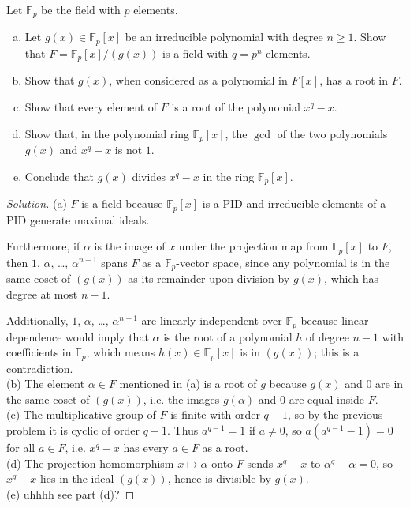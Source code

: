 \documentclass[10pt]{article}
\providecommand{\FF}{\mathbb F}
\providecommand{\ii}{\item}
\newenvironment{soln}{\begin{proof}[Solution]}{\end{proof}}
\begin{document}
\begin{problem}
    Let $\FF_p$ be the field with $p$ elements.
    \begin{enumerate}[(a)]
	\ii Let $g(x)\in\FF_p[x]$ be an irreducible polynomial with degree $n\ge1$.
	Show that $F=\FF_p[x]/(g(x))$ is a field with $q=p^n$ elements.
	\ii Show that $g(x)$, when considered as
	a polynomial in $F[x]$, has a root in $F$.
	\ii Show that every element of $F$ is a root of the polynomial $x^q - x$.
	\ii Show that, in the polynomial ring $\FF_p[x]$,
	the $\gcd$ of the two polynomials $g(x)$ and $x^q - x$ is not $1$.
	\ii Conclude that $g(x)$ divides $x^q - x$ in the ring $\FF_p[x]$.
    \end{enumerate}
\end{problem}

\begin{soln}
    (a) $F$ is a field because $\FF_p[x]$ is a PID
    and irreducible elements of a PID generate maximal ideals.

    Furthermore, if $\alpha$ is the image of $x$
    under the projection map from $\FF_p[x]$ to $F$,
    then $1$, $\alpha$, \dots, $\alpha^{n-1}$ spans
    $F$ as a $\FF_p$-vector space, since any polynomial is in the same
    coset of $(g(x))$ as its remainder upon division by $g(x)$,
    which has degree at most $n-1$.

    Additionally, $1$, $\alpha$, \dots, $\alpha^{n-1}$ are
    linearly independent over $\FF_p$
    because linear dependence would imply that
    $\alpha$ is the root of a polynomial $h$ of degree $n-1$
    with coefficients in $\FF_p$, which means $h(x)\in\FF_p[x]$
    is in $(g(x))$; this is a contradiction.
    \\

    (b) The element $\alpha\in F$ mentioned in (a) is a root of $g$
    because $g(x)$ and $0$ are in the same coset of $(g(x))$, i.e.
    the images $g(\alpha)$ and $0$ are equal inside $F$.
    \\

    (c) The multiplicative group of $F$ is finite with order $q-1$,
    so by the previous problem it is cyclic of order $q-1$.
    Thus $a^{q-1} = 1$ if $a\ne 0$, so
    $a(a^{q-1}-1) = 0$ for all $a\in F$, i.e. $x^q - x$ has
    every $a\in F$ as a root.
    \\

    (d) The projection homomorphism $x\mapsto \alpha$ onto $F$ sends
    $x^q - x$ to $\alpha^q - \alpha = 0$, so $x^q - x$
    lies in the ideal $(g(x))$, hence is divisible by $g(x)$.
    \\

    (e) uhhhh see part (d)?
\end{soln}
\end{document}
